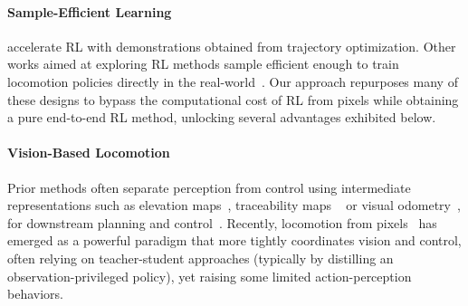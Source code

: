 \paragraph{Sample-Efficient Learning}
\citep{bogdanovic2022model, smith2023learning} accelerate RL with demonstrations obtained from trajectory optimization.
Other works aimed at exploring RL methods sample efficient enough to train locomotion policies directly in the real-world~\cite{smith2022legged, wu2023daydreamer}.
Our approach repurposes many of these designs to bypass the computational cost of RL from pixels while obtaining a pure end-to-end RL method, unlocking several advantages exhibited below.

\paragraph{Vision-Based Locomotion}
Prior methods often separate perception from control using intermediate representations such as elevation maps~\citep{kleiner2007real,peng2017deeploco,fankhauser2018probabilistic,gangapurwala2021real,tsounis2020deepgait,rudin2022learning,miki2022learning, duan2023learning, hoeller2024anymal, chane2024cat}, traceability maps ~\citep{chavez2018learning, yang2021real} or visual odometry~\citep{bloesch2015robust,wisth2019robust,wisth2022vilens,buchanan2022learning},  for downstream planning and control~\citep{wermelinger2016navigation,mastalli2017trajectory,magana2019fast,jenelten2020perceptive,kim2020vision,agrawal2022vision}.
Recently, locomotion from pixels~\citep{yu2021visual,margolis2021learning,loquercio2023learning,agarwal2023legged,zhuang2023robot,cheng2023parkour} has emerged as a powerful paradigm that more tightly coordinates vision and control, often relying on teacher-student approaches (typically by distilling an observation-privileged policy), yet raising some limited action-perception behaviors.

